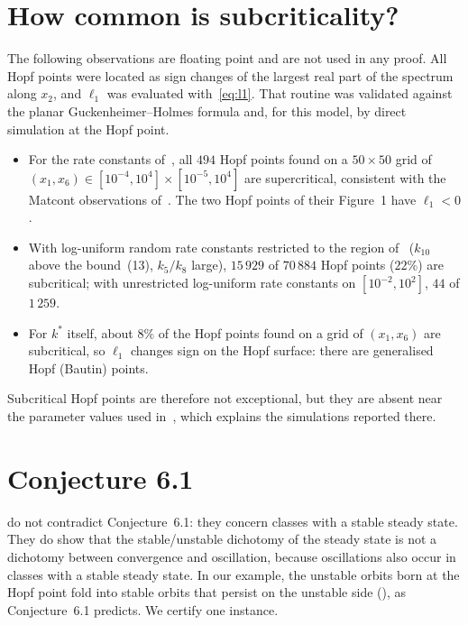 \documentclass[11pt,a4paper]{report}
\begin{document}
\section{How common is subcriticality?}\label{sec:numerics}
The following observations are floating point and are not used in any proof. All Hopf points were located as sign changes of the largest real part of the spectrum along $x_2$, and $\ell_1$ was evaluated with~\eqref{eq:l1}. That routine was validated against the planar Guckenheimer--Holmes formula and, for this model, by direct simulation at the Hopf point.
\begin{itemize}
\item For the rate constants of~\autocite[Table~1]{CMS2019}, all $494$ Hopf points found on a $50\times50$ grid of $(x_1,x_6)\in[10^{-4},10^4]\times[10^{-5},10^{4}]$ are supercritical, consistent with the Matcont observations of~\autocite[Figs.~2 and 4]{CMS2019}. The two Hopf points of their Figure~1 have $\ell_1<0$.
\item With log-uniform random rate constants restricted to the region of~\autocite[Thm.~4.2]{CMS2019} ($k_{10}$ above the bound~(13), $k_5/k_8$ large), $15\,929$ of $70\,884$ Hopf points ($22\%$) are subcritical; with unrestricted log-uniform rate constants on $[10^{-2},10^{2}]$, $44$ of $1\,259$.
\item For $k^*$ itself, about $8\%$ of the Hopf points found on a grid of $(x_1,x_6)$ are subcritical, so $\ell_1$ changes sign on the Hopf surface: there are generalised Hopf (Bautin) points.
\end{itemize}
Subcritical Hopf points are therefore not exceptional, but they are absent near the parameter values used in~\autocite{CMS2019}, which explains the simulations reported there.

\section{Conjecture 6.1}\label{sec:conj}
 do not contradict Conjecture~6.1: they concern classes with a stable steady state. They do show that the stable/unstable dichotomy of the steady state is not a dichotomy between convergence and oscillation, because oscillations also occur in classes with a stable steady state. In our example, the unstable orbits born at the Hopf point fold into stable orbits that persist on the unstable side (), as Conjecture~6.1 predicts. We certify one instance.
\end{document}
